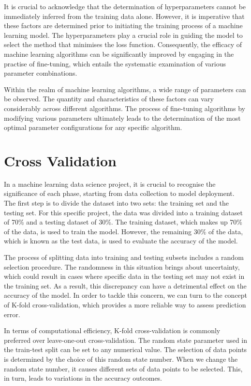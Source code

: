 It is crucial to acknowledge that the determination of hyperparameters cannot be immediately inferred from the training data alone. However, it is imperative that these factors are determined prior to initiating the training process of a machine learning model. The hyperparameters play a crucial role in guiding the model to select the method that minimises the loss function. Consequently, the efficacy of machine learning algorithms can be significantly improved by engaging in the practise of fine-tuning, which entails the systematic examination of various parameter combinations.

Within the realm of machine learning algorithms, a wide range of parameters can be observed. The quantity and characteristics of these factors can vary considerably across different algorithms. The process of fine-tuning algorithms by modifying various parameters ultimately leads to the determination of the most optimal parameter configurations for any specific algorithm\cite{YANG201361}.


\newpage
\section{Cross Validation}



In a machine learning data science project, it is crucial to recognise the significance of each phase, starting from data collection to model deployment. The first step is to divide the dataset into two sets: the training set and the testing set. For this specific project, the data was divided into a training dataset of 70\% and a testing dataset of 30\%. The training dataset, which makes up 70\% of the data, is used to train the model. However, the remaining 30\% of the data, which is known as the test data, is used to evaluate the accuracy of the model.

The process of splitting data into training and testing subsets includes a random selection procedure. The randomness in this situation brings about uncertainty, which could result in cases where specific data in the testing set may not exist in the training set. As a result, this discrepancy can have a detrimental effect on the accuracy of the model. In order to tackle this concern, we can turn to the concept of K-fold cross-validation, which provides a more reliable way to assess prediction error.

In terms of computational efficiency,\cite{wong2019reliable} K-fold cross-validation is commonly preferred over leave-one-out cross-validation. The random state parameter used in the train-test split can be set to any numerical value. The selection of data points is determined by the choice of this random state number. When we change the random state number, it causes different sets of data points to be selected. This, in turn, leads to variations in the accuracy outcomes.

